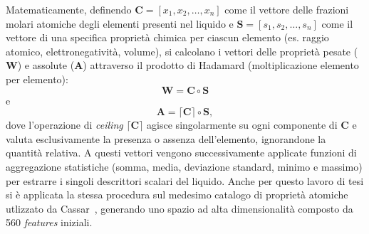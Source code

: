\documentclass[../main.tex]{subfiles}
\begin{document}
	Matematicamente, definendo $\boldsymbol{C} = [x_1, x_2, \dots, x_n]$ come il vettore delle frazioni molari atomiche degli elementi presenti nel liquido e $\boldsymbol{S} = [s_1, s_2, \dots, s_n]$ come il vettore di una specifica proprietà chimica per ciascun elemento (es. raggio atomico, elettronegatività, volume), si calcolano i vettori delle proprietà pesate ($\boldsymbol{W}$) e assolute ($\boldsymbol{A}$) attraverso il prodotto di Hadamard (moltiplicazione elemento per elemento):
	\begin{equation}
		\boldsymbol{W} = \boldsymbol{C} \circ \boldsymbol{S}
	\end{equation}
	e
	\begin{equation}
		\boldsymbol{A} = \lceil \boldsymbol{C} \rceil \circ \boldsymbol{S},
	\end{equation}
	dove l'operazione di \textit{ceiling} $\lceil \boldsymbol{C} \rceil$ agisce singolarmente su ogni componente di $\boldsymbol{C}$ e valuta esclusivamente la presenza o assenza dell'elemento, ignorandone la quantità relativa. A questi vettori vengono successivamente applicate funzioni di aggregazione statistiche (somma, media, deviazione standard, minimo e massimo) per estrarre i singoli descrittori scalari del liquido. Anche per questo lavoro di tesi si è applicata la stessa procedura sul medesimo catalogo di proprietà atomiche utlizzato da Cassar~\cite{cassarViscNetNeuralNetwork2021}, generando uno spazio ad alta dimensionalità composto da 560 \textit{features} iniziali.
	
\end{document}

